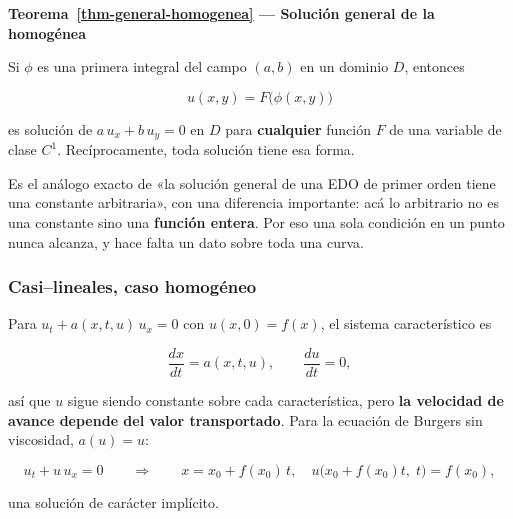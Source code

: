 \documentclass[
  spanish,
  a4paper,
]{scrbook}
\theoremstyle{definition}
\theoremstyle{plain}
\theoremstyle{definition}
\theoremstyle{plain}
\theoremstyle{definition}
\theoremstyle{remark}
\begin{document}
\begin{tcolorbox}[enhanced jigsaw, arc=.35mm, bottomrule=.15mm, breakable, colback=white, colframe=quarto-callout-note-color-frame, left=2mm, leftrule=.75mm, opacityback=0, rightrule=.15mm, toprule=.15mm]
\begin{minipage}[t]{5.5mm}
\textcolor{quarto-callout-note-color}{\faInfo}
\end{minipage}%
\begin{minipage}[t]{\textwidth - 5.5mm}

\vspace{-3mm}\textbf{Teorema~\ref{thm-general-homogenea} --- Solución general de la homogénea}\vspace{3mm}

Si \(\phi\) es una primera integral del campo \((a,b)\) en un dominio
\(D\), entonces

\[
u(x,y) = F\big(\phi(x,y)\big)
\]

es solución de \(a\,u_x + b\,u_y = 0\) en \(D\) para \textbf{cualquier}
función \(F\) de una variable de clase \(C^1\). Recíprocamente, toda
solución tiene esa forma.

\end{minipage}%
\end{tcolorbox}

Es el análogo exacto de «la solución general de una EDO de primer orden
tiene una constante arbitraria», con una diferencia importante: acá lo
arbitrario no es una constante sino una \textbf{función entera}. Por eso
una sola condición en un punto nunca alcanza, y hace falta un dato sobre
toda una curva.

\subsubsection{Casi--lineales, caso
homogéneo}\label{casilineales-caso-homoguxe9neo}

Para \(u_t + a(x,t,u)\,u_x = 0\) con \(u(x,0)=f(x)\), el sistema
característico es

\[
\frac{dx}{dt} = a(x,t,u), \qquad \frac{du}{dt} = 0 ,
\]

así que \(u\) sigue siendo constante sobre cada característica, pero
\textbf{la velocidad de avance depende del valor transportado}. Para la
ecuación de Burgers sin viscosidad, \(a(u)=u\):

\[
u_t + u\,u_x = 0 \qquad\Longrightarrow\qquad
x = x_0 + f(x_0)\,t, \quad u\big(x_0+f(x_0)t,\;t\big) = f(x_0) ,
\]

una solución de carácter implícito.
\end{document}
